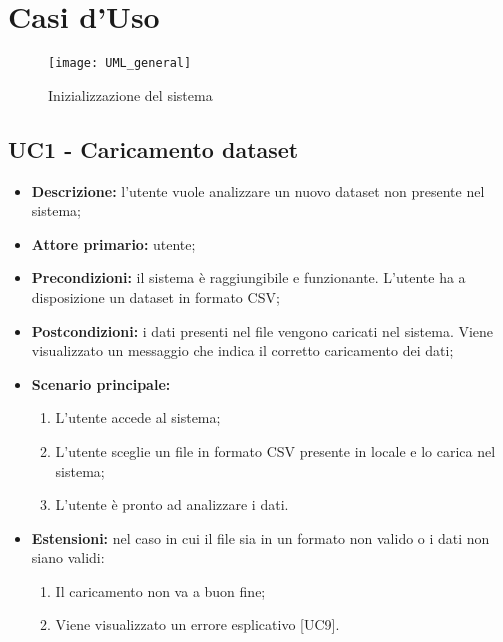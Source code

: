 \chapter{Casi d'Uso}


\begin{figure}[h]
  \centering
  \texttt{[image: UML\_general]}
  \caption{Inizializzazione del sistema}
\end{figure}
\section{UC1 - Caricamento dataset}
\begin{itemize}
  \item \textbf{Descrizione:} l'utente vuole analizzare un nuovo dataset non presente nel sistema;
  \item \textbf{Attore primario:} utente;
  \item \textbf{Precondizioni:} il sistema è raggiungibile e funzionante. L’utente ha a disposizione un dataset in formato CSV;
  \item \textbf{Postcondizioni:} i dati presenti nel file vengono caricati nel sistema. Viene visualizzato un messaggio che indica il corretto caricamento dei dati;
  \item \textbf{Scenario principale:}
  \begin{enumerate}
    \item L'utente accede al sistema;
    \item L'utente sceglie un file in formato CSV presente in locale e lo carica nel sistema;
    \item L'utente è pronto ad analizzare i dati.
  \end{enumerate}
  \item \textbf{Estensioni:} nel caso in cui il file sia in un formato non valido o i dati non siano validi:
    \begin{enumerate}
      \item Il caricamento non va a buon fine;
      \item Viene visualizzato un errore esplicativo [UC9].
    \end{enumerate}
\end{itemize}


